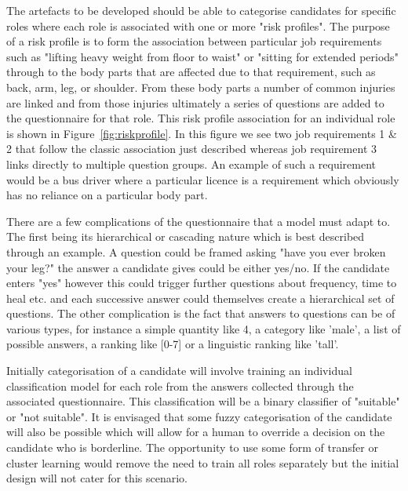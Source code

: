 

The artefacts to be developed should be able to categorise candidates for specific roles where each role is
associated with one or more "risk profiles". The purpose of a risk profile is to form the association between
particular job requirements such as "lifting heavy weight from floor to waist" or "sitting for extended periods"
through to the body parts that are affected
due to that requirement, such as back, arm, leg, or shoulder. From these body parts a number of common injuries are linked and from those injuries
ultimately a series of questions are added to the questionnaire for that role. This risk profile association
for an individual role is shown in Figure~\ref{fig:riskprofile}. In this figure we see two job requirements 1 \& 2
that follow the classic association just described whereas job requirement 3 links directly to multiple question groups.
An example of such a requirement would be a bus driver where a particular licence is a requirement which obviously has
no reliance on a particular body part.




There are a few complications of the questionnaire that a model must adapt to. The first being its hierarchical or cascading
nature which is best described through an example.
A question could be framed asking "have you ever broken your leg?" the answer a candidate gives could be either yes/no.
If the candidate enters "yes" however this could trigger further questions about frequency, time to heal etc. and each
successive answer could themselves create a hierarchical set of questions. The other complication is the fact that answers
to questions can be of various types, for instance a simple quantity like 4, a category like 'male', a list of possible
answers, a ranking like [0-7] or a linguistic ranking like 'tall'.

Initially categorisation of a candidate will involve training an individual classification model for each role from
the answers collected through the associated questionnaire. This classification will be a binary classifier
of "suitable" or "not suitable". It is envisaged that some fuzzy categorisation of the candidate will also be
possible which will allow for a human to override a decision on the candidate who is borderline. The opportunity
to use some form of transfer or cluster learning would remove the need to train all roles separately but the initial
design will not cater for this scenario.


